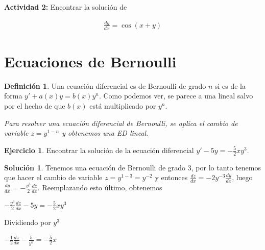 \documentclass{article}
\theoremstyle{plain}
\theoremstyle{definition}
\newtheorem{defin}[thm]{Definición}
\newtheorem{ejer}[thm]{Ejercicio}
\newtheorem{sol}[thm]{Solución}
\begin{document}
\textbf{Actividad 2: } Encontrar la solución de

\begin{align*}
    \frac{dy}{dx} = \cos(x+y)
\end{align*}







\newpage

\section{Ecuaciones de Bernoulli}



\begin{defin}Una ecuación diferencial es de Bernoulli de grado $n$ si es de la forma $y'+a(x)y=b(x)y^n$. Como podemos ver, se parece a una lineal salvo por el hecho de que $b(x)$ está multiplicado por $y^n$.\\
\end{defin}

\textit{Para resolver una ecuación diferencial de Bernoulli, se aplica el cambio de variable $z=y^{1-n}$ y obtenemos una ED lineal}. \\

\begin{ejer}Encontrar la solución de la ecuación diferencial $\displaystyle y'-5y = -\frac{5}{2} x y^3$.\\
\end{ejer}

\begin{sol}Tenemos una ecuación de Bernoulli de grado 3, por lo tanto tenemos que hacer el cambio de variable $z=y^{1-3}=y^{-2}$ y entonces $\displaystyle \frac{dz}{dx}=  -2 y^{-3}\frac{dy}{dx} $, luego  $\displaystyle \frac{dy}{dx}=  -\frac{y^3}{2}\frac{dz}{dx} $. Reemplazando esto último, obtenemos \\
\end{sol}



\begin{center}
$\displaystyle -\frac{y^3}{2}\frac{dz}{dx}-5y = -\frac{5}{2} x y^3$
\end{center}

Dividiendo por $y^3$


\begin{center}
$\displaystyle -\frac{1}{2}\frac{dz}{dx}-\frac{5}{y^2} = -\frac{5}{2} x$
\end{center}
\end{document}
